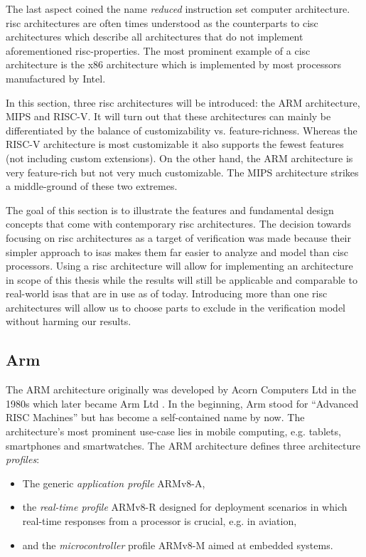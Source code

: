 The last aspect coined the name \textit{reduced} instruction set computer architecture.
\gls{risc} architectures are often times understood as the counterparts to \gls{cisc} architectures which describe all architectures that do not implement aforementioned \gls{risc}-properties.
The most prominent example of a \gls{cisc} architecture is the x86 architecture which is implemented by most processors manufactured by Intel.

In this section, three \gls{risc} architectures will be introduced: the ARM architecture, MIPS and RISC-V.
It will turn out that these architectures can mainly be differentiated by the balance of customizability vs. feature-richness.
Whereas the RISC-V architecture is most customizable it also supports the fewest features (not including custom extensions).
On the other hand, the ARM architecture is very feature-rich but not very much customizable.
The MIPS architecture strikes a middle-ground of these two extremes.

The goal of this section is to illustrate the features and fundamental design concepts that come with contemporary \gls{risc} architectures.
The decision towards focusing on \gls{risc} architectures as a target of verification was made because their simpler approach to \glspl{isa} makes them far easier to analyze and model than \gls{cisc} processors.
Using a \gls{risc} architecture will allow for implementing an architecture in scope of this thesis while the results will still be applicable and comparable to real-world \glspl{isa} that are in use as of today.
Introducing more than one \gls{risc} architectures will allow us to choose parts to exclude in the verification model without harming our results.

\subsection{Arm}

The ARM architecture originally was developed by Acorn Computers Ltd in the 1980s which later became Arm Ltd  \cite{ArmHistory}.
In the beginning, Arm stood for \enquote{Advanced RISC Machines} but has become a self-contained name by now.
The architecture's most prominent use-case lies in mobile computing, e.g. tablets, smartphones and smartwatches.
The ARM architecture defines three architecture \textit{profiles}:
\begin{itemize}
    \item The generic \textit{application profile} ARMv8-A,
    \item the \textit{real-time profile} ARMv8-R designed for deployment scenarios in which real-time responses from a processor is crucial, e.g. in aviation,
    \item and the \textit{microcontroller} profile ARMv8-M aimed at embedded systems.
\end{itemize}

